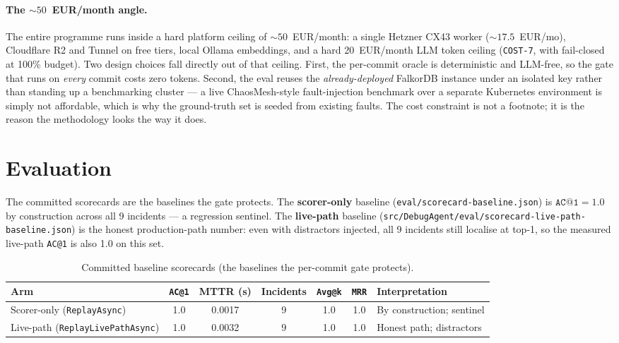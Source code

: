 \documentclass[11pt]{article}
\makeatletter
\newcommand{\acone}{\texttt{AC@1}}
\newcommand{\code}[1]{\texttt{#1}}
\makeatother
\begin{document}
\paragraph{The ${\sim}50$~EUR/month angle.}
The entire programme runs inside a hard platform ceiling of ${\sim}50$~EUR/month: a single
Hetzner CX43 worker (${\sim}17.5$~EUR/mo), Cloudflare R2 and Tunnel on free tiers, local
Ollama embeddings, and a hard 20~EUR/month LLM token ceiling (\code{COST-7}, with
fail-closed at 100\% budget). Two design choices fall directly out of that ceiling. First,
the per-commit oracle is deterministic and LLM-free, so the gate that runs on \emph{every}
commit costs zero tokens. Second, the eval reuses the \emph{already-deployed} FalkorDB
instance under an isolated key rather than standing up a benchmarking cluster --- a live
ChaosMesh-style fault-injection benchmark over a separate Kubernetes environment is simply
not affordable, which is why the ground-truth set is seeded from existing faults. The cost
constraint is not a footnote; it is the reason the methodology looks the way it does.

\section{Evaluation}
\label{sec:eval}

The committed scorecards are the baselines the gate protects. The \textbf{scorer-only}
baseline (\code{eval/scorecard-baseline.json}) is $\acone{} = 1.0$ by construction across
all 9 incidents --- a regression sentinel. The \textbf{live-path} baseline
(\code{src/DebugAgent/eval/scorecard-live-path-baseline.json}) is the honest production-path
number: even with distractors injected, all 9 incidents still localise at top-1, so the
measured live-path \acone{} is also 1.0 on this set.

\begin{table}[h]
\centering
\caption{Committed baseline scorecards (the baselines the per-commit gate protects).}
\label{tab:scorecards}
\begin{tabular}{lcccccl}
\toprule
Arm & \acone{} & MTTR (s) & Incidents & \code{Avg@k} & \code{MRR} & Interpretation \\
\midrule
Scorer-only (\code{ReplayAsync})        & 1.0 & 0.0017 & 9 & 1.0 & 1.0 & By construction; sentinel \\
Live-path (\code{ReplayLivePathAsync})  & 1.0 & 0.0032 & 9 & 1.0 & 1.0 & Honest path; distractors \\
\bottomrule
\end{tabular}
\end{table}
\end{document}
